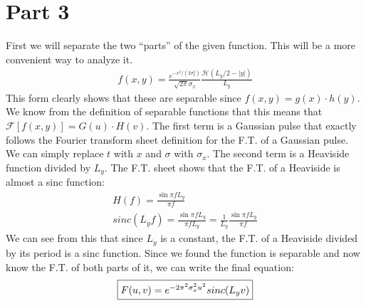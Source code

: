 \documentclass[12 pt]{article}
\begin{document}
\section*{Part 3}
First we will separate the two ``parts'' of the given function. This will be a more convenient way to analyze it.
\begin{align*}
    f(x,y)=\frac{e^{-x^2/(2\sigma_x^2)}}{\sqrt{2\pi}\sigma_x}\frac{\mathcal{H}(L_y/2-|y|)}{L_y}
\end{align*}
This form clearly shows that these are separable since $f(x, y)=g(x)\cdot h(y)$. We know from the definition of
separable functions that this means that $\mathcal{F}\left[f(x, y)\right]=G(u)\cdot H(v)$. The first term is a Gaussian
pulse that exactly follows the Fourier transform sheet definition for the F.T. of a Gaussian pulse. We can simply
replace $t$ with $x$ and $\sigma$ with $\sigma_x$. The second term is a Heaviside function divided by $L_y$. The F.T.
sheet shows that the F.T. of a Heaviside is almost a sinc function:
\begin{align*}
    H(f) = \frac{\sin{\pi fL_y}}{\pi f} \\
    sinc(L_yf) = \frac{\sin{\pi fL_y}}{\pi fL_y}=\frac{1}{L_y}\frac{\sin{\pi fL_y}}{\pi f}
\end{align*}
We can see from this that since $L_y$ is a constant, the F.T. of a Heaviside divided by its period is a sinc function.
Since we found the function is separable and now know the F.T. of both parts of it, we can write the final equation:
\begin{align*}
    \fbox{$F(u, v)=e^{-2\pi^2\sigma_x^2u^2}sinc(L_yv)$}
\end{align*}
\end{document}
